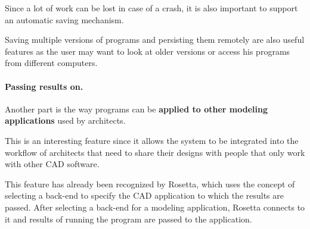\documentclass{./llncs2e/llncs}
\begin{document}
	
	Since a lot of work can be lost in case of a crash, it is also important to support an automatic saving mechanism.

	Saving multiple versions of programs and persisting them remotely are also useful features as the user may want to look at older versions or access his programs from different computers.

	\paragraph{Passing results on.}
	Another part is the way programs can be \textbf{applied to other modeling applications} used by architects.
	
	This is an interesting feature since it allows the system to be integrated into the workflow of architects that need to share their designs with people that only work with other CAD software.
	
	This feature has already been recognized by Rosetta, which uses the concept of selecting a back-end to specify the CAD application to which the results are passed.
	After selecting a back-end for a modeling application, Rosetta connects to it and results of running the program are passed to the application. 
	
\end{document}
